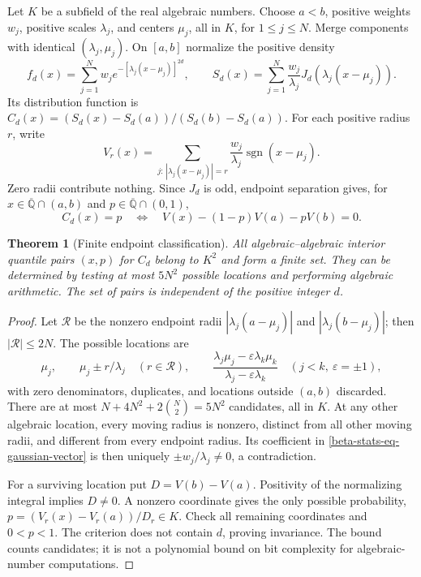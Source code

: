 \documentclass[11pt,a4paper]{article}
\newtheorem{theorem}{Theorem}[section]
\theoremstyle{definition}
\theoremstyle{remark}
\numberwithin{equation}{section}
\begin{document}
Let $K$ be a subfield of the real algebraic numbers. Choose
$a<b$, positive weights $w_j$, positive scales $\lambda_j$, and
centers $\mu_j$, all in $K$, for $1\le j\le N$. Merge components
with identical $(\lambda_j,\mu_j)$. On $[a,b]$ normalize the positive
density
\[
f_d(x)=\sum_{j=1}^{N}w_j
e^{-[\lambda_j(x-\mu_j)]^{2d}},\qquad
S_d(x)=\sum_{j=1}^{N}\frac{w_j}{\lambda_j}
J_d(\lambda_j(x-\mu_j)).
\]
Its distribution function is
$C_d(x)=(S_d(x)-S_d(a))/(S_d(b)-S_d(a))$.
For each positive radius $r$, write
\[
V_r(x)=\sum_{j:\,|\lambda_j(x-\mu_j)|=r}
\frac{w_j}{\lambda_j}\operatorname{sgn}(x-\mu_j).
\]
Zero radii contribute nothing. Since $J_d$ is odd, endpoint
separation gives, for $x\in\overline{\mathbb Q}\cap(a,b)$ and
$p\in\overline{\mathbb Q}\cap(0,1)$,
\begin{equation}
\label{beta-stats-eq-gaussian-vector}
C_d(x)=p
\quad\Longleftrightarrow\quad
V(x)-(1-p)V(a)-pV(b)=0.
\end{equation}

\begin{theorem}[Finite endpoint classification]
\label{beta-stats-thm-gaussian}
All algebraic--algebraic interior quantile pairs $(x,p)$ for $C_d$
belong to $K^2$ and form a finite set. They can be determined by
testing at most $5N^2$ possible locations and performing algebraic
arithmetic. The set of pairs is independent of the positive integer
$d$.
\end{theorem}

\begin{proof}
Let $\mathcal R$ be the nonzero endpoint radii
$|\lambda_j(a-\mu_j)|$ and $|\lambda_j(b-\mu_j)|$; then
$|\mathcal R|\le2N$. The possible locations are
\[
\mu_j,\qquad \mu_j\pm r/\lambda_j\quad(r\in\mathcal R),\qquad
\frac{\lambda_j\mu_j-\varepsilon\lambda_k\mu_k}
{\lambda_j-\varepsilon\lambda_k}\quad(j<k,\ \varepsilon=\pm1),
\]
with zero denominators, duplicates, and locations outside $(a,b)$
discarded. There are at most
$N+4N^2+2\binom N2=5N^2$ candidates, all in $K$.
At any other algebraic location, every moving radius is nonzero,
distinct from all other moving radii, and different from every
endpoint radius. Its coefficient in
\eqref{beta-stats-eq-gaussian-vector} is then uniquely
$\pm w_j/\lambda_j\ne0$, a contradiction.

For a surviving location put $D=V(b)-V(a)$. Positivity of the
normalizing integral implies $D\ne0$. A nonzero coordinate gives
the only possible probability,
$p=(V_r(x)-V_r(a))/D_r\in K$. Check all remaining coordinates and
$0<p<1$. The criterion does not contain $d$, proving invariance.
The bound counts candidates; it is not a polynomial bound on bit
complexity for algebraic-number computations.
\end{proof}
\end{document}
